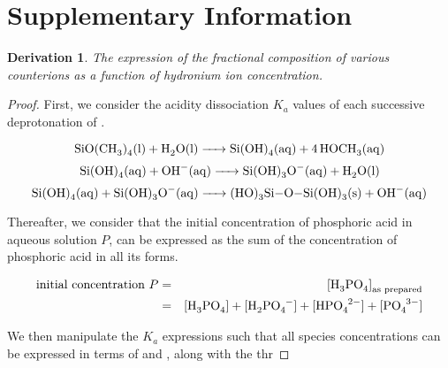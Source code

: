 \documentclass[10pt,twoside,a4paper]{article}
\newtheorem{thm}{Derivation}
\begin{document}
\section*{Supplementary Information}
     
    \begin{thm}The expression of the fractional composition of various counterions as a function of hydronium ion concentration.
    \end{thm}


	\begin{proof} First, we consider the acidity dissociation $K_a$ values of each successive deprotonation of .
	
		\begin{equation*}
 		\ce{SiO(CH3)4(l) + H2O(l) -> Si(OH)4(aq) + 4HOCH3(aq)}
 		\end{equation*}
 		\begin{equation*}
 		\ce{Si(OH)4(aq) + OH^-(aq) -> Si(OH)3O^-(aq) + H2O(l)}
 		\end{equation*}
 		\begin{equation*}
 		\ce{Si(OH)4(aq) + Si(OH)3O^-(aq) -> (HO)3Si-O-Si(OH)3(s) + OH^-(aq)}
 		\end{equation*}
 		
 	
 		
 	Thereafter, we consider that the initial concentration of phosphoric acid in aqueous solution $P$, can be expressed as
 	the sum of the concentration of phosphoric acid in all its forms.
 		
 		\begin{eqnarray}
 		\text{initial concentration } P & = & \ce{[H3PO4]}_\text{as prepared} \nonumber \\ 
 		& = & \ce{[H3PO4] + [H2PO4^-] + [HPO4^{2-}] + [PO4^{3-}]} \nonumber 		
 		\end{eqnarray}
 		
 	We then manipulate the $K_a$ expressions such that all species concentrations can be expressed in terms of \ce{[H_3PO_4]} and \ce{[H3O+]}, along with the thr

 		
	\end{proof}
	
\end{document}
